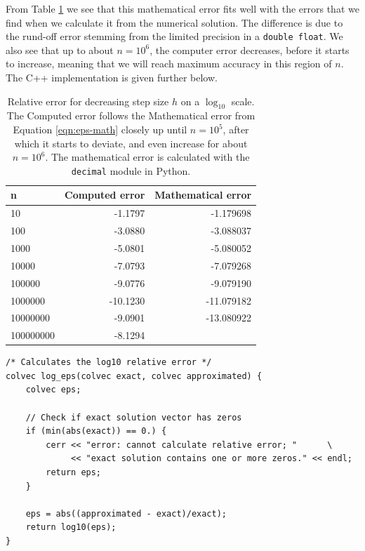 \documentclass[]{article}
\begin{document}
From Table \ref{tab:eps} we see that this mathematical error fits well with the errors that we find when we calculate it from the numerical solution. The difference is due to the rund-off error stemming from the limited precision in a \lstinline|double float|. We also see that up to about $n = 10^6$, the computer error decreases, before it starts to increase, meaning that we will reach maximum accuracy in this region of $n$. The C++ implementation is given further below.

\begin{table}[ht]
\caption{Relative error for decreasing step size $h$ on a $\log_{10}$ scale. The Computed error follows the Mathematical error from Equation \ref{eqn:eps-math} closely up until $n = 10^5$, after which it starts to deviate, and even increase for about $n = 10^6$. The mathematical error is calculated with the \lstinline|decimal| module in Python.}
\label{tab:eps}
\begin{center}
\begin{tabular}{lrr}
	\toprule
	n &  Computed error &  Mathematical error \\
	\midrule
	10        &   -1.1797 &   -1.179698 \\
	100       &   -3.0880 &   -3.088037 \\
	1000      &   -5.0801 &   -5.080052 \\
	10000     &   -7.0793 &   -7.079268 \\
	100000    &   -9.0776 &   -9.079190 \\
	1000000   &  -10.1230 &  -11.079182 \\
	10000000  &   -9.0901 &  -13.080922 \\
	100000000 &   -8.1294 &             \\
	\bottomrule
\end{tabular}
\end{center}
\end{table}

\begin{lstlisting}
/* Calculates the log10 relative error */
colvec log_eps(colvec exact, colvec approximated) {
	colvec eps;
	
	// Check if exact solution vector has zeros
	if (min(abs(exact)) == 0.) {
		cerr << "error: cannot calculate relative error; "		\
		     << "exact solution contains one or more zeros." << endl;
		return eps;
	}
	
	eps = abs((approximated - exact)/exact);
	return log10(eps);
}
\end{lstlisting}
\end{document}
